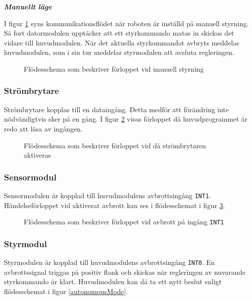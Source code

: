\documentclass[11pt]{article}
\begin{document}
\begin{flushleft}
\textbf{\textit{Manuellt läge}}

I figur \ref{manualMode} syns kommunikationsflödet när roboten är inställd på manuell styrning. Så fort datormodulen upptäcker att ett styrkommando matas in skickas det vidare till huvudmodulen. När det aktuella styrkommandot avbryts meddelas huvudmodulen, som i sin tur meddelar styrmodulen att avsluta regleringen.

\begin{figure}[htbp]
\centering
\noindent\resizebox{0.7\linewidth}{!}{
	}
	\cprotect\caption{Flödesschema som beskriver förloppet vid manuell styrning \label{manualMode}}	
\end{figure}

\subsubsection {Strömbrytare}
Strömbrytare kopplas till en dataingång. Detta medför att förändring inte nödvändigtvis sker på en gång. I figur \ref{strombrytare} visas förloppet då huvudprogrammet är redo att läsa av ingången. 

\begin{figure}[htbp]
\centering
\noindent\resizebox{.6\linewidth}{!}{
	}
	\cprotect\caption{Flödesschema som beskriver förloppet vid då strömbrytaren aktiveras \label{strombrytare}}	
\end{figure}

\subsubsection {Sensormodul} 
Sensormodulen är kopplad till huvudmodulens avbrottsingång \verb+INT1+. Händelseförloppet vid aktiverat avbrott kan ses i flödesschemat i figur \ref{avbrott_sensormodul}.

\begin{figure}[htbp]
\centering
\noindent\resizebox{1\linewidth}{!}{
	}
	\cprotect\caption{Flödesschema som beskriver förloppet vid avbrott på ingång \verb+INT1+ \label{avbrott_sensormodul}}	
\end{figure}

\subsubsection{Styrmodul}
\label{styrModul}
Styrmodulen är kopplad till huvudmodulens avbrottsingång  \verb+INT0+. En avbrottssignal triggas på positiv flank och skickas när regleringen av nuvarande styrkommando är klart. Huvudmodulen kan då ta ett nytt beslut enligt flödesschemat i figur \ref{autonomousMode}.


\end{flushleft}
\end{document}

